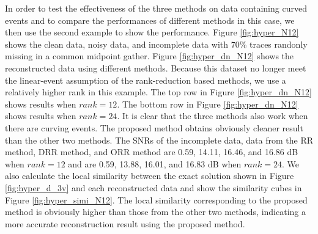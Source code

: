 In order to test the effectiveness of the three methods on data containing curved events and to compare the performances of different methods in this case, we then use the second example to show the performance.  Figure \ref{fig:hyper_N12} shows the clean data, noisy data, and incomplete data with 70\% traces randonly missing in a common midpoint gather. Figure \ref{fig:hyper_dn_N12} shows the reconstructed data using different methods. Because this dataset no longer meet the linear-event assumption of the rank-reduction based methods, we use a relatively higher rank in this example. The top row in Figure \ref{fig:hyper_dn_N12} shows results when $rank = 12$. The bottom row in Figure \ref{fig:hyper_dn_N12} shows results when $rank = 24$. It is clear that the three methods also work when there are curving events. The proposed method obtains obviously cleaner result than the other two methods. The SNRs of the incomplete data, data from the RR method, DRR method, and ORR method are 0.59, 14.11, 16.46, and 16.86 dB when $rank=12$ and are 0.59, 13.88, 16.01, and 16.83 dB when $rank=24$. We also calculate the local similarity between the exact solution shown in Figure \ref{fig:hyper_d_3v} and each reconstructed data and show the similarity cubes in Figure \ref{fig:hyper_simi_N12}. The local similarity corresponding to the proposed method is obviously higher than those from the  other two methods, indicating a more accurate reconstruction result using the proposed method. 

